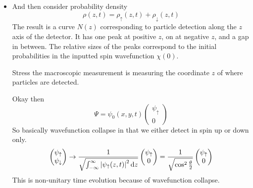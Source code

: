 \documentclass[11pt, a4paper]{article}
\newcommand{\diff}{\mathop{}\!\mathrm{d}} %
\newcommand{\ua}{\uparrow}  %
\newcommand{\da}{\downarrow}  %
\begin{document}
\begin{itemize}
    \item And then consider probability density
    \begin{equation*}
        \rho(z, t) = \rho_{\ua}(z, t) + \rho_{\da}(z, t)
    \end{equation*}
    The result is a curve $ N(z) $ corresponding to particle detection along the $ z $ axis of the detector. It has one peak at positive $ z $, on at negative $ z $, and a gap in between. The relative sizes of the peaks correspond to the initial probabilities in the inputted spin wavefunction $ \chi(0) $.
    
    Stress the macroscopic measurement is measuring the coordinate $ z $ of where particles are detected. 

    Okay then
    \begin{equation*}
        \Psi = \psi_{0}(x, y, t)
        \begin{pmatrix}
            \psi_{\ua}\\
            0
        \end{pmatrix}
    \end{equation*}
    So basically wavefunction collapse in that we either detect in spin up or down only. 
    \begin{equation*}
        \begin{pmatrix}
            \psi_{\ua}\\
            \psi_{\da}
        \end{pmatrix}
        \to 
        \frac{1}{\sqrt{\int_{-\infty}^{\infty} \abs{\psi_{\ua} (z, t)}^{2}\diff z}}
        \begin{pmatrix}
            \psi_{\ua}\\
            0
        \end{pmatrix}
        = \frac{1}{\sqrt{\cos^{2}\frac{\theta}{2}}}
        \begin{pmatrix}
            \psi_{\ua}\\
            0
        \end{pmatrix}
    \end{equation*}
    This is non-unitary time evolution because of wavefunction collapse. 
    
\end{itemize}
\end{document}
